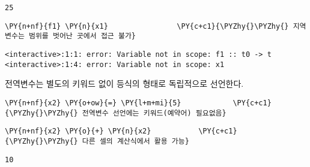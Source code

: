     
    \begin{Verbatim}[commandchars=\\\{\}]
25
    \end{Verbatim}

    
    \begin{tcolorbox}[breakable, size=fbox, boxrule=1pt, pad at break*=1mm,colback=cellbackground, colframe=cellborder, top=.75ex]
\begin{Verbatim}[commandchars=\\\{\}]
\PY{n+nf}{f1} \PY{n}{x1}                \PY{c+c1}{\PYZhy{}\PYZhy{} 지역변수는 범위를 벗어난 곳에서 접근 불가}
\end{Verbatim}
\end{tcolorbox}

    \begin{Verbatim}[commandchars=\\\{\}, frame=single, framerule=1mm, rulecolor=\color{outerrorbackground}]
<interactive>:1:1: error: Variable not in scope: f1 :: t0 -> t
<interactive>:1:4: error: Variable not in scope: x1
    \end{Verbatim}

    \noindent 전역변수는 별도의 키워드 없이 등식의 형태로 독립적으로
선언한다.

    \begin{tcolorbox}[breakable, size=fbox, boxrule=1pt, pad at break*=1mm,colback=cellbackground, colframe=cellborder, top=.75ex]
\begin{Verbatim}[commandchars=\\\{\}]
\PY{n+nf}{x2} \PY{o+ow}{=} \PY{l+m+mi}{5}            \PY{c+c1}{\PYZhy{}\PYZhy{} 전역변수 선언에는 키워드(예약어) 필요없음}
\end{Verbatim}
\end{tcolorbox}

    \begin{tcolorbox}[breakable, size=fbox, boxrule=1pt, pad at break*=1mm,colback=cellbackground, colframe=cellborder, top=.75ex]
\begin{Verbatim}[commandchars=\\\{\}]
\PY{n+nf}{x2} \PY{o}{+} \PY{n}{x2}           \PY{c+c1}{\PYZhy{}\PYZhy{} 다른 셀의 계산식에서 활용 가능}
\end{Verbatim}
\end{tcolorbox}

    
    \begin{Verbatim}[commandchars=\\\{\}]
10
    \end{Verbatim}

